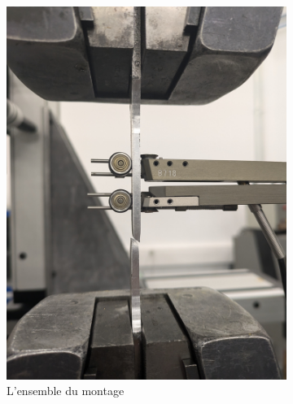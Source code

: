 \begin{figure}[h!]
    \centering
    \begin{subfigure}[t]{.4\textwidth}
        \includegraphics[width=\textwidth]{../ressources/images/extensometre}
        \caption{L'ensemble du montage}
        \label{fig:montage}
    \end{subfigure}
    \begin{subfigure}[t]{.4\textwidth}

\end{subfigure}
\end{figure}
